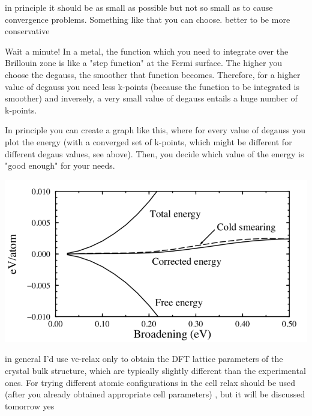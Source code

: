 
  in principle it should be as small as possible but not so small as to cause convergence problems. Something like that you can choose.  better to be more conservative

  Wait a minute! In a metal, the function which you need to integrate over the Brillouin zone is like a "step function" at the Fermi surface. The higher you choose the degauss, the smoother that function becomes. Therefore, for a higher value of degauss you need less k-points (because the function to be integrated is smoother) and inversely, a very small value of degauss entails a huge number of k-points.

  In principle you can create a graph like this, where for every value of degauss you plot the energy (with a converged set of k-points, which might be different for different degaus values, see above). Then, you decide which value of the energy is "good enough" for your needs.

  \includegraphics[scale = 0.6]{figs/D2/smearing.png}


  in general I'd use vc-relax only to obtain the DFT lattice parameters of the crystal bulk structure, which are typically slightly different than the experimental ones. For trying different atomic configurations in the cell relax should be used (after you already obtained appropriate cell parameters) , but it will be discussed tomorrow yes


